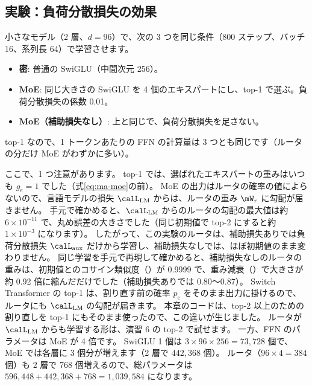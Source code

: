 \subsection*{実験：負荷分散損失の効果}

小さなモデル（2 層、$d=96$）で、次の 3 つを同じ条件（800 ステップ、バッチ 16、系列長 64）で学習させます。
\begin{itemize}
\item \textbf{密}: 普通の SwiGLU（中間次元 256）。
\item \textbf{MoE}: 同じ大きさの SwiGLU を 4 個のエキスパートにし、top-1 で選ぶ。負荷分散損失の係数 0.01。
\item \textbf{MoE（補助損失なし）}: 上と同じで、負荷分散損失を足さない。
\end{itemize}
top-1 なので、1 トークンあたりの FFN の計算量は 3 つとも同じです（ルータの分だけ MoE がわずかに多い）。

ここで、1 つ注意があります。
top-1 では、選ばれたエキスパートの重みはいつも $g_e=1$ でした（式\eqref{eq:ma-moe}の前）。
MoE の出力はルータの確率の値によらないので、言語モデルの損失 $\calL_{\mathrm{LM}}$ からは、ルータの重み $\mW_r$ に勾配が届きません。
手元で確かめると、$\calL_{\mathrm{LM}}$ からのルータの勾配の最大値は約 $6\times10^{-11}$ で、丸め誤差の大きさでした（同じ初期値で top-2 にすると約 $1\times10^{-3}$ になります）。
したがって、この実験のルータは、補助損失ありでは負荷分散損失 $\calL_{\mathrm{aux}}$ だけから学習し、補助損失なしでは、ほぼ初期値のまま変わりません。
同じ学習を手元で再現して確かめると、補助損失なしのルータの重みは、初期値とのコサイン類似度（）が 0.9999 で、重み減衰（）で大きさが約 0.92 倍に縮んだだけでした（補助損失ありでは 0.80〜0.87）。
Switch Transformer の top-1 は、割り直す前の確率 $p_e$ をそのまま出力に掛けるので、ルータにも $\calL_{\mathrm{LM}}$ の勾配が届きます\cite{fedus2022switch}。
本章のコードは、top-2 以上のための割り直しを top-1 にもそのまま使ったので、この違いが生じました。
ルータが $\calL_{\mathrm{LM}}$ からも学習する形は、演習 6 の top-2 で試せます。
一方、FFN のパラメータは MoE が 4 倍です。
SwiGLU 1 個は $3\times96\times256=73{,}728$ 個で、MoE では各層に 3 個分が増えます（2 層で $442{,}368$ 個）。
ルータ（$96\times4=384$ 個）も 2 層で 768 個増えるので、総パラメータは $596{,}448+442{,}368+768=1{,}039{,}584$ になります。

